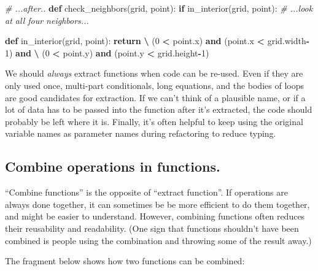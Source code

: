 \documentclass[
]{krantz}
\makeatletter
\newenvironment{Shaded}{\begin{snugshade}}{\end{snugshade}}
\newcommand{\CommentTok}[1]{\textcolor[rgb]{0.56,0.35,0.01}{\textit{#1}}}
\newcommand{\ControlFlowTok}[1]{\textcolor[rgb]{0.13,0.29,0.53}{\textbf{#1}}}
\newcommand{\DecValTok}[1]{\textcolor[rgb]{0.00,0.00,0.81}{#1}}
\newcommand{\KeywordTok}[1]{\textcolor[rgb]{0.13,0.29,0.53}{\textbf{#1}}}
\newcommand{\NormalTok}[1]{#1}
\newcommand{\OperatorTok}[1]{\textcolor[rgb]{0.81,0.36,0.00}{\textbf{#1}}}
\newenvironment{kframe}{%
\medskip{}
\setlength{\fboxsep}{.8em}
 \def\at@end@of@kframe{}%
 \ifinner\ifhmode%
  \def\at@end@of@kframe{\end{minipage}}%
  \begin{minipage}{\columnwidth}%
 \fi\fi%
 \def\FrameCommand##1{\hskip\@totalleftmargin \hskip-\fboxsep
 \colorbox{shadecolor}{##1}\hskip-\fboxsep
     \hskip-\linewidth \hskip-\@totalleftmargin \hskip\columnwidth}%
 \MakeFramed {\advance\hsize-\width
   \@totalleftmargin\z@ \linewidth\hsize
   \@setminipage}}%
 {\par\unskip\endMakeFramed%
 \at@end@of@kframe}
\renewenvironment{Shaded}{\begin{kframe}}{\end{kframe}}
\makeatother
\begin{document}
\begin{Shaded}
\begin{Highlighting}[]
\CommentTok{\# ...after..}
\KeywordTok{def}\NormalTok{ check\_neighbors(grid, point):}
    \ControlFlowTok{if}\NormalTok{ in\_interior(grid, point):}
        \CommentTok{\# ...look at all four neighbors...}

\KeywordTok{def}\NormalTok{ in\_interior(grid, point):}
    \ControlFlowTok{return} \OperatorTok{\textbackslash{}}
\NormalTok{    (}\DecValTok{0} \OperatorTok{\textless{}}\NormalTok{ point.x) }\KeywordTok{and}\NormalTok{ (point.x }\OperatorTok{\textless{}}\NormalTok{ grid.width}\OperatorTok{{-}}\DecValTok{1}\NormalTok{) }\KeywordTok{and} \OperatorTok{\textbackslash{}}
\NormalTok{    (}\DecValTok{0} \OperatorTok{\textless{}}\NormalTok{ point.y) }\KeywordTok{and}\NormalTok{ (point.y }\OperatorTok{\textless{}}\NormalTok{ grid.height}\OperatorTok{{-}}\DecValTok{1}\NormalTok{)}
\end{Highlighting}
\end{Shaded}

We should \emph{always} extract functions when code can be re-used.
Even if they are only used once,
multi-part conditionals,
long equations,
and the bodies of loops are good candidates for extraction.
If we can't think of a plausible name,
or if a lot of data has to be passed into the function after it's extracted,
the code should probably be left where it is.
Finally,
it's often helpful to keep using the original variable names as parameter names during refactoring
to reduce typing.

\hypertarget{combine-operations-in-functions.}{%
\subsection{Combine operations in functions.}\label{combine-operations-in-functions.}}

``Combine functions'' is the opposite of ``extract function''.
If operations are always done together,
it can sometimes be be more efficient to do them together,
and might be easier to understand.
However,
combining functions often reduces their reusability and readability.
(One sign that functions shouldn't have been combined is
people using the combination and throwing some of the result away.)

The fragment below shows how two functions can be combined:
\end{document}
